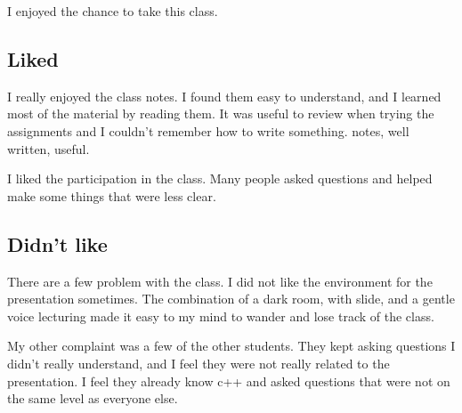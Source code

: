 \documentclass[12pt]{article}
\begin{document}
I enjoyed the chance to take this class.

\subsection{Liked}
I really enjoyed the class notes.  I found them easy to understand, and I learned most of the material by reading them.  It was useful to review when trying the assignments and I couldn't remember how to write something.
notes, well written, useful.

I liked the participation in the class.  Many people asked questions and helped make some things that were less clear.

\subsection{Didn't like}

There are a few problem with the class.  I did not like the environment for the presentation sometimes.  The combination of a dark room, with slide, and a gentle voice lecturing made it easy to my mind to wander and lose track of the class.

My other complaint was a few of the other students.  They kept asking questions I didn't really understand, and I feel they were not really related to the presentation.  I feel they already know c++ and asked questions that were not on the same level as everyone else.
\end{document}
